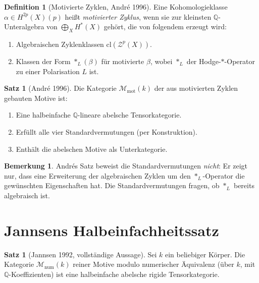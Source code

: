 \documentclass[12pt,a4paper]{amsart}
\theoremstyle{definition}
\newtheorem{satz}[theorem]{Satz}
\newtheorem{bemerkung}[theorem]{Bemerkung}
\newtheorem{definition_de}[theorem]{Definition}
\newcommand{\Q}{\mathbb{Q}}
\newcommand{\cl}{\mathrm{cl}}
\begin{document}
\begin{definition_de}[Motivierte Zyklen, Andr\'{e} 1996]
Eine Kohomologieklasse $\alpha \in H^{2p}(X)(p)$ heißt \emph{motivierter
Zyklus}, wenn sie zur kleinsten $\Q$-Unteralgebra von $\bigoplus_X H^*(X)$
gehört, die von folgendem erzeugt wird:
\begin{enumerate}[label=(\roman*)]
  \item Algebraischen Zyklenklassen $\cl(\mathcal{Z}^p(X))$.
  \item Klassen der Form $*_L(\beta)$ für motivierte $\beta$, wobei $*_L$
        der Hodge-$*$-Operator zu einer Polarisation $L$ ist.
\end{enumerate}
\end{definition_de}

\begin{satz}[Andr\'{e} 1996]\label{satz:andre}
Die Kategorie $\mathcal{M}_{\mathrm{mot}}(k)$ der aus motivierten Zyklen
gebauten Motive ist:
\begin{enumerate}[label=(\roman*)]
  \item Eine halbeinfache $\Q$-lineare abelsche Tensorkategorie.
  \item Erfüllt alle vier Standardvermutungen (per Konstruktion).
  \item Enthält die abelschen Motive als Unterkategorie.
\end{enumerate}
\end{satz}

\begin{bemerkung}
Andrés Satz beweist die Standardvermutungen \emph{nicht}: Er zeigt nur,
dass eine Erweiterung der algebraischen Zyklen um den $*_L$-Operator die
gewünschten Eigenschaften hat.  Die Standardvermutungen fragen, ob $*_L$
bereits algebraisch ist.
\end{bemerkung}

\section{Jannsens Halbeinfachheitssatz}\label{sec:jannsen}

\begin{satz}[Jannsen 1992, vollständige Aussage]\label{satz:jannsen_voll}
Sei $k$ ein beliebiger Körper.  Die Kategorie $\mathcal{M}_{\mathrm{num}}(k)$
reiner Motive modulo numerischer Äquivalenz (über $k$, mit $\Q$-Koeffizienten)
ist eine halbeinfache abelsche rigide Tensorkategorie.
\end{satz}
\end{document}
